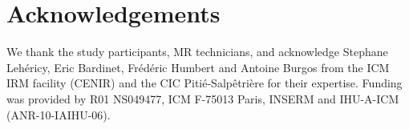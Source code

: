 \section{Acknowledgements}

We thank the study participants, MR technicians, and acknowledge Stephane Lehéricy, Eric Bardinet, Frédéric Humbert and
Antoine Burgos from the ICM IRM facility (CENIR) and the CIC
Pitié-Salpêtrière for their expertise. Funding was provided by R01 NS049477, ICM F-75013 Paris, INSERM and IHU-A-ICM
(ANR-10-IAIHU-06).